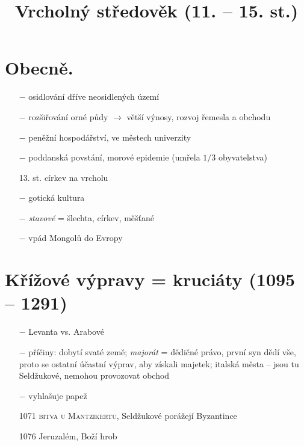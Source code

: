 \documentclass{article}
\title{\vspace{-2cm}Vrcholný středověk (11. -- 15. st.)\vspace{-1.7cm}}
\date{}
\author{}
\begin{document}
\maketitle

\section*{Obecně.}
\begin{itemize}
    \vspace{-0.5em}
    \setlength\itemsep{0.15em}
    \item[$-$] osidlování dříve neosidlených území
    \item[$-$] rozšiřování orné půdy $\rightarrow$ větší výnosy, rozvoj řemesla a obchodu
    \item[$-$] peněžní hospodářství,  ve městech univerzity
    \item[$-$] poddanská povstání, morové epidemie (umřela $1 / 3$ obyvatelstva)
    \item[13. st.] církev na vrcholu
    \item[$-$] gotická kultura
    \item[$-$] \textit{stavové} = šlechta, církev, měšťané
    \item[$-$] vpád Mongolů do Evropy
\end{itemize}


\section*{Křížové výpravy = kruciáty (1095 -- 1291)}
\begin{itemize}
    \vspace{-0.5em}
    \setlength\itemsep{0.15em}
    \item[$-$] Levanta vs. Arabové
    \item[$-$] příčiny: dobytí svaté země; \textit{majorát} = dědičné právo, první syn dědí vše, proto se ostatní účastní výprav, aby získali majetek; italská města -- jsou tu Seldžukové, nemohou provozovat obchod
    \item[$-$] vyhlašuje papež
    \item[1071] \textsc{bitva u Mantzikertu}, Seldžukové porážejí Byzantince
    \item[1076] Jeruzalém, Boží hrob
\end{itemize}
\end{document}
